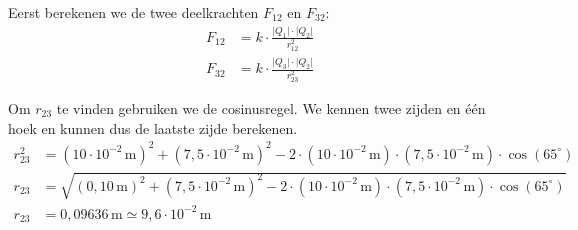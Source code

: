 \documentclass{ximera}
\begin{document}
\begin{example}[foldable=true,title={Voorbeeld: drie ladingen niet op een lijn}]
\begin{solution}
\begin{center}
            \end{center}
        
        Eerst berekenen we de twee deelkrachten $F_{12}$ en $F_{32}$:
        \begin{align*}
            F_{12} &= k \cdot \frac{\lvert Q_{1}\rvert \cdot \lvert Q_{2}\rvert}{r^{2}_{12}} \\
            F_{32} &= k \cdot \frac{\lvert Q_{3}\rvert \cdot \lvert Q_{2}\rvert}{r^{2}_{23}}
        \end{align*}        
        
        Om $r_{23}$ te vinden gebruiken we de cosinusregel. We kennen twee zijden en één hoek en kunnen dus de laatste zijde berekenen.
        \begin{align*}
            r^{2}_{23} &= (10 \cdot 10^{-2} \, \mathrm{m})^{2} + (7{,}5 \cdot 10^{-2} \, \mathrm{m})^{2} - 2 \cdot (10 \cdot 10^{-2} \, \mathrm{m}) \cdot (7{,}5 \cdot 10^{-2} \, \mathrm{m}) \cdot \cos(65^\circ) \\
            r_{23} &= \sqrt{(0{,}10 \, \mathrm{m})^{2} + (7{,}5 \cdot 10^{-2} \, \mathrm{m})^{2} - 2 \cdot (10 \cdot 10^{-2} \, \mathrm{m}) \cdot (7{,}5 \cdot 10^{-2} \, \mathrm{m}) \cdot \cos(65^\circ)} \\
            r_{23} &= 0{,}09636 \, \mathrm{m}\simeq 9{,}6 \cdot 10^{-2} \, \mathrm{m}
        \end{align*}
        

\end{solution}
\end{example}
\end{document}
